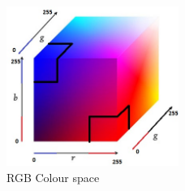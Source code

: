 \begin{figure}[h!]
  \label{vis4}
  \caption{RGB Colour space}
  \centering
    \includegraphics[width=0.5\textwidth]{RGB_Space.jpg}
\end{figure}



